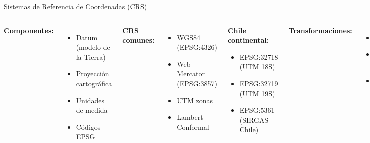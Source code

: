 \documentclass[10pt]{beamer}
\begin{document}
\begin{frame}{Sistemas de Referencia de Coordenadas (CRS)}
    \begin{columns}
        \textbf{Componentes:}
        \begin{itemize}
            \item Datum (modelo de la Tierra)
            \item Proyección cartográfica
            \item Unidades de medida
            \item Códigos EPSG
        \end{itemize}
        
        \textbf{CRS comunes:}
        \begin{itemize}
            \item WGS84 (EPSG:4326)
            \item Web Mercator (EPSG:3857)
            \item UTM zonas
            \item Lambert Conformal
        \end{itemize}
        
        \begin{tcolorbox}[colframe=usachred,colback=red!5]
            \textbf{Chile continental:}
            \begin{itemize}
                \item EPSG:32718 (UTM 18S)
                \item EPSG:32719 (UTM 19S)
                \item EPSG:5361 (SIRGAS-Chile)
            \end{itemize}
        \end{tcolorbox}
        
        \vspace{0.3cm}
        
        \textbf{Transformaciones:}
        \begin{itemize}
            \item Reproyección
            \item Cambio de datum
            \item Distorsiones inevitables
        \end{itemize}
    \end{columns}
\end{frame}
\end{document}
